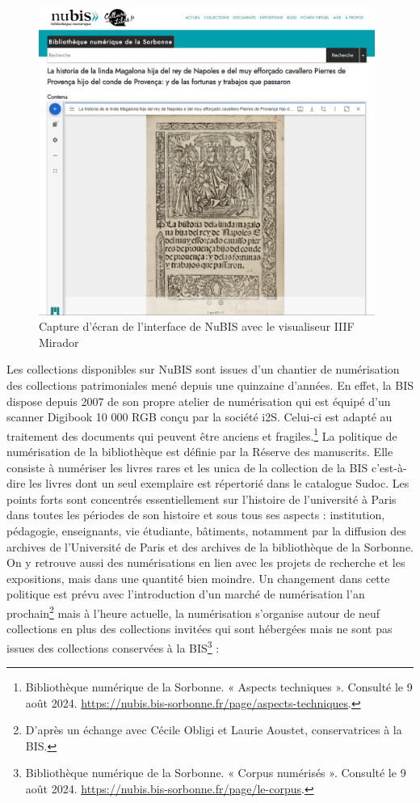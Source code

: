 \documentclass[a4paper,12pt,twoside]{book}
\begin{document}
\begin{figure} [H]
\includegraphics[width=4.33681in,height=3.97569in]{vertopal_157ae480aa4a4b07be198b586a812241/media/image1.png}
\caption{Capture d'écran de l'interface de NuBIS avec le visualiseur IIIF Mirador}
\end{figure} 


Les collections disponibles sur NuBIS sont issues d'un chantier de
numérisation des collections patrimoniales mené depuis une quinzaine
d'années. En effet, la BIS dispose depuis 2007 de son
propre atelier de numérisation qui est équipé d'un scanner Digibook 10
000 RGB conçu par la société i2S. Celui-ci est adapté au traitement des
documents qui peuvent être anciens et fragiles.\footnote{Bibliothèque
	numérique de la Sorbonne. « Aspects techniques ». Consulté le 9 août
	2024.
	\url{https://nubis.bis-sorbonne.fr/page/aspects-techniques}.}
La politique de numérisation de la bibliothèque est définie par la
Réserve des manuscrits. Elle consiste à numériser les livres rares et
les unica de la collection de la BIS c'est-à-dire les
livres dont un seul exemplaire est répertorié dans le catalogue Sudoc.
Les points forts sont concentrés essentiellement sur l'histoire de
l'université à Paris dans toutes les périodes de son histoire et sous
tous ses aspects : institution, pédagogie, enseignants, vie étudiante,
bâtiments, notamment par la diffusion des archives de
l'Université de Paris et des archives de la bibliothèque
de la Sorbonne. On y retrouve aussi des numérisations en lien avec les
projets de recherche et les expositions, mais dans une quantité bien
moindre. Un changement dans cette politique est prévu avec
l'introduction d'un marché de numérisation
l'an prochain\footnote{D'après un échange avec Cécile
	Obligi et Laurie Aoustet, conservatrices à la BIS.} mais à l'heure
actuelle, la numérisation s'organise autour de neuf collections en plus
des collections invitées qui sont hébergées mais ne sont pas issues des
collections conservées à la BIS\footnote{Bibliothèque numérique de la
	Sorbonne. « Corpus numérisés ». Consulté le 9 août 2024.
	\url{https://nubis.bis-sorbonne.fr/page/le-corpus}.}
: \\
\end{document}
